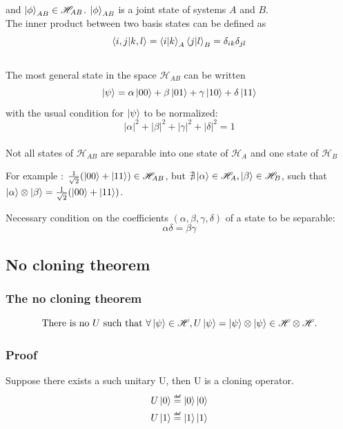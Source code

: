 \documentclass{article}
\newcommand\eqdef{\mathrel{\overset{\makebox[0pt]{\mbox{\normalfont\tiny\sffamily def}}}{=}}}
\begin{document}
and $\ket{\phi}_{AB} \in \mathscr{H}_{AB}$. $\ket{\phi}_{AB}$ is a joint state of systems $A$ and $B$.
\\\noindent
The inner product between two basis states can be defined as
\begin{equation}
    \braket{i,j|k,l}=\braket{i|k}_A\braket{j|l}_B = \delta_{ik}\delta_{jl}
\end{equation}
\\\noindent
The most general state in the space $\mathscr{H}_{AB}$ can be written
\begin{equation}
    \ket{\psi} = \alpha \ket{00} + \beta \ket{01} + \gamma \ket{10} + \delta \ket{11}
\end{equation}
with the usual condition for $\ket{\psi}$ to be normalized:
\begin{equation}
    |\alpha|^2+|\beta|^2+|\gamma|^2+|\delta|^2 = 1
\end{equation}
\\\noindent
Not all states of $\mathscr{H}_{AB}$ are separable into one state of $\mathscr{H}_{A}$ and one state of $\mathscr{H}_{B}$

For example : $\frac{1}{\sqrt{2}}(\ket{00} + \ket{11}) \in \mathscr{H}_{AB}$, but
$\nexists \ket{\alpha}\in \mathscr{H}_A, \ket{\beta}\in \mathscr{H}_B$, such that \\\noindent
$\ket{\alpha}\otimes\ket{\beta} = \frac{1}{\sqrt{2}}(\ket{00} + \ket{11})$.

Necessary condition on the coefficients $(\alpha, \beta, \gamma, \delta)$ of a state to be separable:
\begin{equation}
    \alpha\delta = \beta\gamma
\end{equation}

\subsection{No cloning theorem}
\subsubsection*{The no cloning theorem}
\begin{equation}
    \text{There is no } U \text{ such that } \forall \ket{\psi} \in \mathscr{H}, U\ket{\psi} = \ket{\psi} \otimes \ket{\psi}
    \in \mathscr{H} \otimes \mathscr{H}.
\end{equation}
\subsubsection*{Proof}
Suppose there exists a such unitary U, then U is a cloning operator.
\begin{equation}
    \begin{aligned}
        U\ket{0} \eqdef \ket{0}\ket{0} \\
        U\ket{1} \eqdef \ket{1}\ket{1}
    \end{aligned}
\end{equation}
\end{document}
